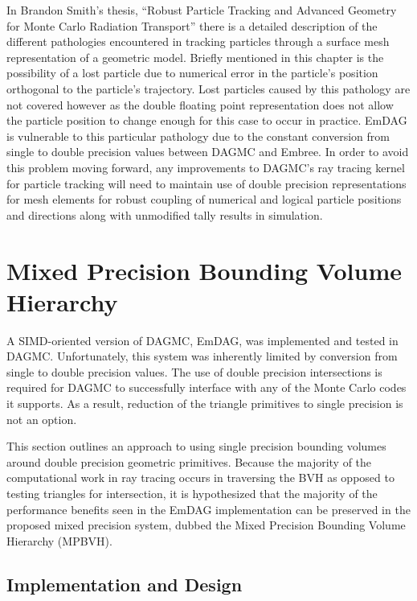 In Brandon Smith's thesis, ``Robust Particle Tracking and Advanced Geometry for
Monte Carlo Radiation Transport'' \cite{Smith_2011} there is a detailed
description of the different pathologies encountered in tracking particles
through a surface mesh representation of a geometric model. Briefly mentioned in
this chapter is the possibility of a lost particle due to numerical error in the
particle's position orthogonal to the particle's trajectory. Lost particles
caused by this pathology are not covered however as the double floating point
representation does not allow the particle position to change enough for this
case to occur in practice. EmDAG is vulnerable to this particular pathology due
to the constant conversion from single to double precision values between DAGMC
and Embree. In order to avoid this problem moving forward, any improvements to
DAGMC's ray tracing kernel for particle tracking will need to maintain use of
double precision representations for mesh elements for robust coupling of
numerical and logical particle positions and directions along with unmodified
tally results in simulation.

\section{Mixed Precision Bounding Volume Hierarchy}\label{sec:MPBVH}

A SIMD-oriented version of DAGMC, EmDAG, was implemented and tested in
DAGMC. Unfortunately, this system was inherently limited by conversion from
single to double precision values. The use of double precision intersections is
required for DAGMC to successfully interface with any of the Monte Carlo codes it
supports. As a result, reduction of the triangle primitives to single precision
is not an option.

This section outlines an approach to using single precision bounding volumes
around double precision geometric primitives. Because the majority of the
computational work in ray tracing occurs in traversing the BVH as opposed to
testing triangles for intersection, it is hypothesized that the majority of the
performance benefits seen in the EmDAG implementation can be preserved in the
proposed mixed precision system, dubbed the Mixed Precision Bounding Volume
Hierarchy (MPBVH).

\subsection{Implementation and Design}


